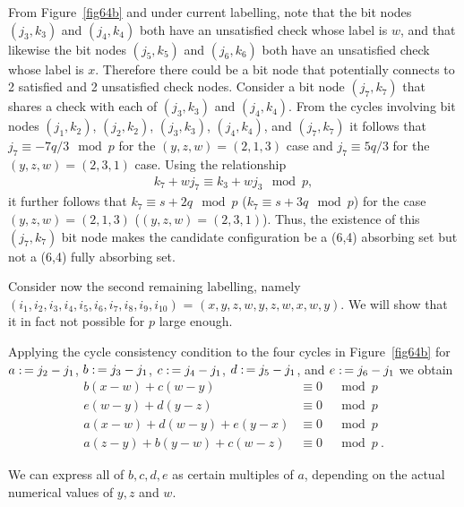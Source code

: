 {From Figure~\ref{fig64b} and under current labelling, note that
the bit nodes $(j_3,k_3)$ and $(j_4,k_4)$ both have an unsatisfied
check whose label is $w$, and that likewise the bit nodes
$(j_5,k_5)$ and $(j_6,k_6)$ both have an unsatisfied check whose
label is $x$. Therefore there could be a bit node that potentially
connects to 2 satisfied and 2 unsatisfied check nodes. Consider a
bit node $(j_7,k_7)$ that shares a check with each of $(j_3,k_3)$
and $(j_4,k_4)$. From the cycles involving bit nodes $(j_1,k_2)$,
$(j_2,k_2)$, $(j_3,k_3)$, $(j_4,k_4)$, and $(j_7,k_7)$ it follows
that $j_7 \equiv -7q/3 \mod p$ for the $(y,z,w)=(2,1,3)$ case and
$j_7 \equiv 5q/3$ for the $(y,z,w)=(2,3,1)$ case. Using the
relationship
\begin{eqnarray*}
k_7 +wj_7 \equiv k_3+wj_3 \mod p,
\end{eqnarray*}
it further follows that $k_7 \equiv s+2q \mod p$  ($k_7 \equiv
s+3q \mod p$) for the case $(y,z,w)=(2,1,3)$ ($(y,z,w)=(2,3,1)$).
Thus, the existence of this $(j_7,k_7)$ bit node makes the
candidate configuration be a (6,4) absorbing set but not a (6,4)
fully absorbing set.}

 Consider now the second remaining labelling, namely $(i_1,i_2,i_3,i_4,i_5,i_6,i_7,i_8,i_9,i_{10})$ =
$(x,y,z,w,y,z,w,x,w,y)$. We will show that it
 in fact not possible for $p$ large enough.


Applying  the cycle consistency condition to the four cycles in
Figure~\ref{fig64b} for $a \asn j_2-j_1$, $b \asn j_3-j_1$, $c
\asn j_4-j_1$, $d \asn j_5-j_1$,  and $e \asn j_6-j_1$ we obtain
\begin{equation}\label{sys33}\begin{array}{cccc}
 b(x-w)+c(w-y) &\equiv 0 &\mod p\\
 e(w-y)+d(y-z) &\equiv 0 &\mod p\\
 a(x-w)+d(w-y)+e(y-x) &\equiv 0 &\mod p\\
 a(z-y)+b(y-w)+c(w-z) &\equiv 0 &\mod p~.
 \end{array}\end{equation}

We can express all of $b,c,d,e$ as certain multiples of
 $a$, depending on the actual numerical values of $y,z$ and $w$.

